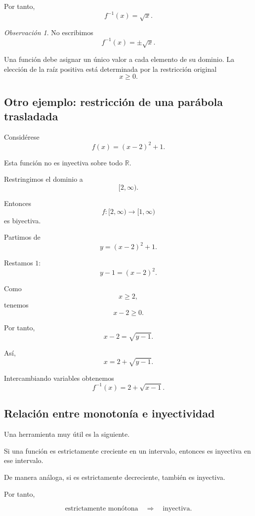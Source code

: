 \documentclass[12pt]{article}
\theoremstyle{remark}
\newtheorem{observacion}{Observación}[section]
\begin{document}
Por tanto,
\[
\boxed{
f^{-1}(x)=\sqrt{x}.
}
\]

\begin{observacion}
No escribimos
\[
f^{-1}(x)=\pm\sqrt{x}.
\]

Una función debe asignar un único valor a cada elemento de su dominio.
La elección de la raíz positiva está determinada por la restricción
original
\[
x\geq0.
\]
\end{observacion}

\subsection{Otro ejemplo: restricción de una parábola trasladada}

Considérese
\[
f(x)=(x-2)^2+1.
\]

Esta función no es inyectiva sobre todo \(\mathbb{R}\).

Restringimos el dominio a
\[
[2,\infty).
\]

Entonces
\[
f:[2,\infty)\longrightarrow[1,\infty)
\]
es biyectiva.

Partimos de
\[
y=(x-2)^2+1.
\]

Restamos \(1\):
\[
y-1=(x-2)^2.
\]

Como
\[
x\geq2,
\]
tenemos
\[
x-2\geq0.
\]

Por tanto,
\[
x-2=\sqrt{y-1}.
\]

Así,
\[
x=2+\sqrt{y-1}.
\]

Intercambiando variables obtenemos
\[
\boxed{
f^{-1}(x)=2+\sqrt{x-1}.
}
\]

\subsection{Relación entre monotonía e inyectividad}

Una herramienta muy útil es la siguiente.

Si una función es estrictamente creciente en un intervalo, entonces
es inyectiva en ese intervalo.

De manera análoga, si es estrictamente decreciente, también es
inyectiva.

Por tanto,

\[
\boxed{
\text{estrictamente monótona}
\quad\Longrightarrow\quad
\text{inyectiva}.
}
\]
\end{document}
